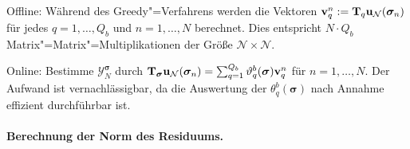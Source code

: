 \documentclass[../main.tex]{subfiles}
\begin{document}
\begin{onoffdescription}
    \item[Offline:]
    Während des Greedy"=Verfahrens werden die Vektoren $\mathbf{v}_{q}^{n} := \mathbf{T}_{q} \mathbf{u}_{\mathcal N}(\bm \sigma_{n})$ für jedes $q = 1, \dots, Q_{b}$ und $n = 1, \dots, N$ berechnet.
    Dies entspricht $N \cdot Q_b$ Matrix"=Matrix"=Multiplikationen der Größe $\mathcal N \times \mathcal N$.

    \item[Online:]
    Bestimme $\mathcal Y_{N}^{\bm \sigma}$ durch $\mathbf{T}_{\bm \sigma} \mathbf{u}_{\mathcal N}(\bm \sigma_{n}) = \sum_{q = 1}^{Q_b} \vartheta_{q}^{b}(\bm \sigma) \mathbf{v}_{q}^{n}$ für $n = 1, \dots, N$.
    Der Aufwand ist vernachlässigbar, da die Auswertung der $\theta_{q}^{b}(\bm \sigma)$ nach Annahme effizient durchführbar ist.
\end{onoffdescription}


\paragraph{Berechnung der Norm des Residuums.} %
\label{par:berechnung_der_norm_des_residuum}
\end{document}
